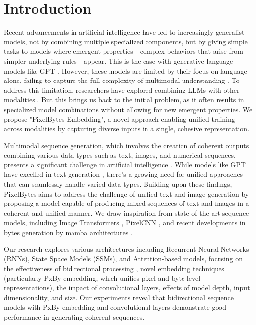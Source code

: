 \documentclass[10pt,a4paper]{article}
\begin{document}
\section{Introduction}

Recent advancements in artificial intelligence have led to increasingly generalist models, not by combining multiple specialized components, but by giving simple tasks to models where emergent properties—complex behaviors that arise from simpler underlying rules—appear. This is the case with generative language models like GPT \cite{brown2020language}. However, these models are limited by their focus on language alone, failing to capture the full complexity of multimodal understanding \cite{alayrac2023language}. To address this limitation, researchers have explored combining LLMs with other modalities \cite{radford2021learning, ramesh2022hierarchical}. But this brings us back to the initial problem, as it often results in specialized model combinations without allowing for new emergent properties. We propose "PixelBytes Embedding", a novel approach enabling unified training across modalities by capturing diverse inputs in a single, cohesive representation.

Multimodal sequence generation, which involves the creation of coherent outputs combining various data types such as text, images, and numerical sequences, presents a significant challenge in artificial intelligence \cite{baltrusaitis2019multimodal}. While models like GPT have excelled in text generation \cite{brown2020language}, there's a growing need for unified approaches that can seamlessly handle varied data types. Building upon these findings, PixelBytes aims to address the challenge of unified text and image generation by proposing a model capable of producing mixed sequences of text and images in a coherent and unified manner. We draw inspiration from state-of-the-art sequence models, including Image Transformers \cite{parmar2018image}, PixelCNN \cite{oord2016conditional}, and recent developments in bytes generation by mamba architectures \cite{wang2024mamba}.

Our research explores various architectures including Recurrent Neural Networks (RNNs), State Space Models (SSMs), and Attention-based models, focusing on the effectiveness of bidirectional processing \cite{gu2023visual, gu2023bidirectional}, novel embedding techniques (particularly PxBy embedding, which unifies pixel and byte-level representations), the impact of convolutional layers, effects of model depth, input dimensionality, and size. Our experiments reveal that bidirectional sequence models with PxBy embedding and convolutional layers demonstrate good performance in generating coherent sequences.
\end{document}
